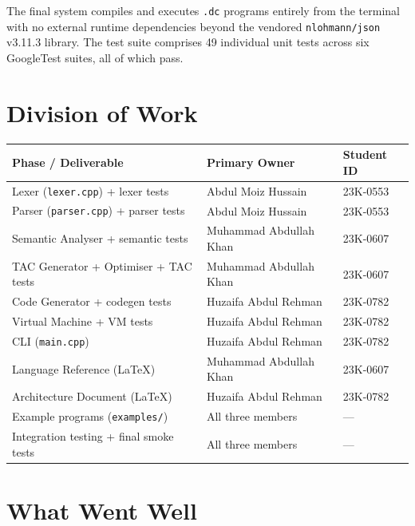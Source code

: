 \documentclass[12pt, a4paper]{article}
\begin{document}
The final system compiles and executes \texttt{.dc} programs entirely from the terminal
with no external runtime dependencies beyond the vendored \texttt{nlohmann/json} v3.11.3
library.
The test suite comprises 49 individual unit tests across six GoogleTest suites, all of
which pass.

\section{Division of Work}

\begin{center}
\begin{tabular}{lll}
\toprule
\textbf{Phase / Deliverable} & \textbf{Primary Owner} & \textbf{Student ID} \\
\midrule
Lexer (\texttt{lexer.cpp}) + lexer tests         & Abdul Moiz Hussain     & 23K-0553 \\
Parser (\texttt{parser.cpp}) + parser tests      & Abdul Moiz Hussain     & 23K-0553 \\
Semantic Analyser + semantic tests               & Muhammad Abdullah Khan & 23K-0607 \\
TAC Generator + Optimiser + TAC tests            & Muhammad Abdullah Khan & 23K-0607 \\
Code Generator + codegen tests                   & Huzaifa Abdul Rehman   & 23K-0782 \\
Virtual Machine + VM tests                       & Huzaifa Abdul Rehman   & 23K-0782 \\
CLI (\texttt{main.cpp})                          & Huzaifa Abdul Rehman   & 23K-0782 \\
Language Reference (LaTeX)                       & Muhammad Abdullah Khan & 23K-0607 \\
Architecture Document (LaTeX)                    & Huzaifa Abdul Rehman   & 23K-0782 \\
Example programs (\texttt{examples/})            & All three members      & --- \\
Integration testing + final smoke tests          & All three members      & --- \\
\bottomrule
\end{tabular}
\end{center}

\section{What Went Well}
\end{document}
